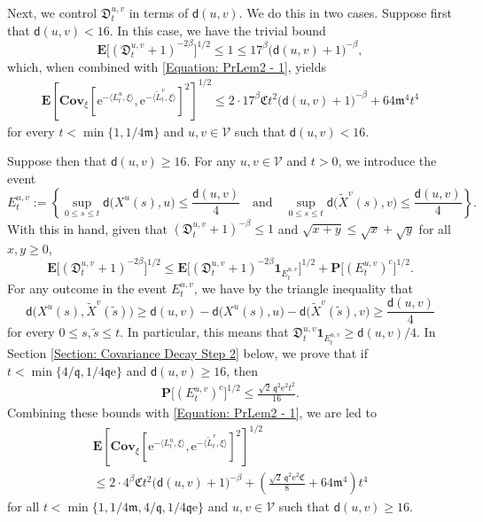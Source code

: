 \documentclass{amsart}
\numberwithin{equation}{section}
\theoremstyle{definition}
\newcommand\be{\beta}
\newcommand\mbf{\mathbf}
\newcommand\mf{\mathfrak}
\newcommand\mr{\mathrm}
\newcommand\ms{\mathscr}
\newcommand\msf{\mathsf}
\begin{document}
Next, we control $\mf D^{u,v}_t$ in terms of 
$\msf d(u,v)$. We do this in two cases. Suppose first that $\msf d(u,v)<16$.
In this case, we have the trivial bound
\[\mbf E\big[(\mf D_t^{u,v}+1)^{-2\be}\big]^{1/2}\leq1\leq17^\be\big(\msf d(u,v)+1\big)^{-\be},\]
which, when combined with \eqref{Equation: PrLem2 - 1}, yields
\begin{align}
\label{Equation: PrLem2 - 2}
\mbf E\left[\mbf{Cov}_\xi\left[\mr e^{-\langle L_t^u,\xi\rangle},\mr e^{-\langle\tilde L_t^v,\xi\rangle}\right]^2\right]^{1/2}\leq
2\cdot17^\be\mf Ct^2\big(\msf d(u,v)+1\big)^{-\be}+64\mf m^4t^4
\end{align}
for every $t<\min\{1,1/4\mf m\}$ and $u,v\in\ms V$ such that $\msf d(u,v)<16$.

%

Suppose then that $\msf d(u,v)\geq16$.
For any $u,v\in \ms V$ and $t>0$, we introduce the event
	\[
		E^{u,v}_t := \left\{\sup_{0\leq s\leq t}\msf d\big(X^u(s),u\big)\leq \frac{\msf d(u,v)}{4}\quad\text{and}\quad\sup_{0\leq s\leq t}\msf d\big(\tilde{X}^v(s),v\big)\leq \frac{\msf d(u,v)}{4}\right\}.
	\]
With this in hand, given that $(\mf D_t^{u,v}+1)^{-\be}\leq1$ and $\sqrt{x+y}\leq\sqrt x+\sqrt y$ for all $x,y\geq0$,
\[\mbf E\big[(\mf D_t^{u,v}+1)^{-2\be}\big]^{1/2}
\leq\mbf E\big[(\mf D_t^{u,v}+1)^{-2\be}\mbf 1_{E^{u,v}_t}\big]^{1/2}+\mbf P\big[(E^{u,v}_t)^c\big]^{1/2}.\]
For any outcome in the event $E^{u,v}_t$, we have by the triangle inequality that
	\[
		\msf d\big(X^u(s),\tilde{X}^v(\tilde s)\big)\geq \msf d(u,v)-\msf d\big(X^u(s),u\big)-\msf d\big(\tilde{X}^v(\tilde s),v\big)\geq  \frac{\msf d(u,v)}{4}
	\]
for every $0\leq s,\tilde s\leq t$. In particular, this means that
$\mf D^{u,v}_t\mbf 1_{E^{u,v}_t}\geq\msf d(u,v)/4$.
In Section \ref{Section: Covariance Decay Step 2} below, we prove that
if $t<\min\{4/\mf q,1/4\mf q\mr e\}$ and $\msf d(u,v)\geq16$,
then
\begin{align}
\label{Equation: Ranges Tail Bound}
\mbf P\big[(E^{u,v}_t)^c\big]^{1/2}\leq \frac{\sqrt 2\,\mf q^2\mr e^2 t^2}{16}.
\end{align}
Combining these bounds with \eqref{Equation: PrLem2 - 1}, we are led to
\begin{multline}
\label{Equation: PrLem2 - 3}
\mbf E\left[\mbf{Cov}_\xi\left[\mr e^{-\langle L_t^u,\xi\rangle},\mr e^{-\langle\tilde L_t^v,\xi\rangle}\right]^2\right]^{1/2}\\
\leq2\cdot 4^\be\mf Ct^2\big(\msf d(u,v)+1\big)^{-\be}+\left(\frac{\sqrt 2\,\mf q^2\mr e^2\mf C}{8}+64\mf m^4\right)t^4
\end{multline}
for all $t<\min\{1,1/4\mf m,4/\mf q,1/4\mf q\mr e\}$ and $u,v\in\ms V$ such that $\msf d(u,v)\geq16$.
\end{document}

